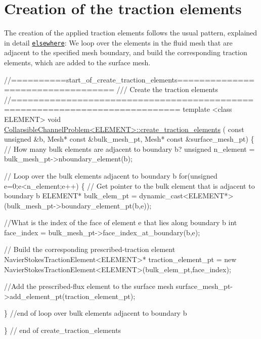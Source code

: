  

\hypertarget{index_tractioncre}{}\section{Creation of the traction elements}\label{index_tractioncre}
The creation of the applied traction elements follows the usual pattern, explained in detail \href{../../../poisson/two_d_poisson_flux_bc_adapt/html/index.html}{\tt elsewhere}\+: We loop over the elements in the fluid mesh that are adjacent to the specified mesh boundary, and build the corresponding traction elements, which are added to the surface mesh.

 
\begin{DoxyCodeInclude}
\textcolor{comment}{//==========start\_of\_create\_traction\_elements==================================}
\textcolor{comment}{/// Create the traction elements}
\textcolor{comment}{}\textcolor{comment}{//============================================================================}
\textcolor{keyword}{template} <\textcolor{keyword}{class} ELEMENT>
\textcolor{keywordtype}{void} \hyperlink{classCollapsibleChannelProblem_a70cfe97c12c0cb6a2a81266cdd4d6088}{CollapsibleChannelProblem<ELEMENT>::create\_traction\_elements}
      (
 \textcolor{keyword}{const} \textcolor{keywordtype}{unsigned} &b, Mesh* \textcolor{keyword}{const} &bulk\_mesh\_pt, Mesh* \textcolor{keyword}{const} &surface\_mesh\_pt)
\{
 \textcolor{comment}{// How many bulk elements are adjacent to boundary b?}
 \textcolor{keywordtype}{unsigned} n\_element = bulk\_mesh\_pt->nboundary\_element(b);

 \textcolor{comment}{// Loop over the bulk elements adjacent to boundary b}
 \textcolor{keywordflow}{for}(\textcolor{keywordtype}{unsigned} e=0;e<n\_element;e++)
  \{
   \textcolor{comment}{// Get pointer to the bulk element that is adjacent to boundary b}
   ELEMENT* bulk\_elem\_pt = \textcolor{keyword}{dynamic\_cast<}ELEMENT*\textcolor{keyword}{>}
    (bulk\_mesh\_pt->boundary\_element\_pt(b,e));
   
   \textcolor{comment}{//What is the index of the face of element e that lies along boundary b}
   \textcolor{keywordtype}{int} face\_index = bulk\_mesh\_pt->face\_index\_at\_boundary(b,e);

   \textcolor{comment}{// Build the corresponding prescribed-traction element}
   NavierStokesTractionElement<ELEMENT>* traction\_element\_pt = 
    \textcolor{keyword}{new}  NavierStokesTractionElement<ELEMENT>(bulk\_elem\_pt,face\_index);
   
   \textcolor{comment}{//Add the prescribed-flux element to the surface mesh}
   surface\_mesh\_pt->add\_element\_pt(traction\_element\_pt);

  \} \textcolor{comment}{//end of loop over bulk elements adjacent to boundary b}

\} \textcolor{comment}{// end of create\_traction\_elements}

\end{DoxyCodeInclude}




